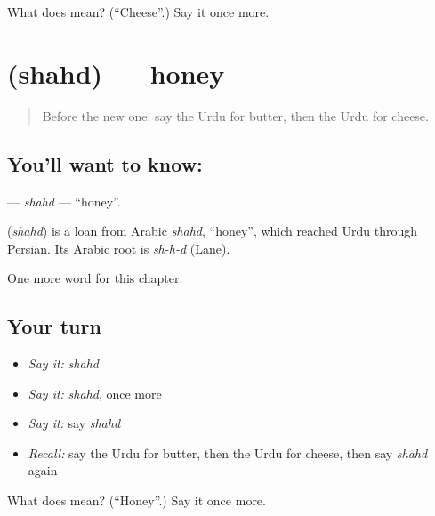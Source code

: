 \begin{tcolorbox}[breakable,colback=teal!4,colframe=teal!35!black,title={Before you move on}]
What does  mean? (\textquotedblleft{}Cheese\textquotedblright{}.) Say it once more.
\end{tcolorbox}
\section[\texorpdfstring{\ur{شہد} (shahd)}{شہد (shahd)}]{ (shahd) — honey}

\label{lesson:UR-C56-shahd}



\begin{quote}
Before the new one: say the Urdu for butter, then the Urdu for cheese.
\end{quote}

\subsection*{You'll want to know: }
\textbf{} — \emph{shahd} — \textquotedblleft{}honey\textquotedblright{}.

\begin{cousinweb}
\textbf{} (\emph{shahd}) is a loan from Arabic \emph{shahd}, \textquotedblleft{}honey\textquotedblright{}, which reached Urdu through Persian. Its Arabic root is \emph{sh-h-d} (Lane).
\end{cousinweb}

\begin{grammarlens}[title={What you've built}]
One more word for this chapter.
\end{grammarlens}

\subsection*{Your turn}
\begin{itemize}
\raggedright
  \item \emph{Say it:} \emph{shahd}
  \item \emph{Say it:} \emph{shahd}, once more
  \item \emph{Say it:} say \emph{shahd}
  \item \emph{Recall:} say the Urdu for butter, then the Urdu for cheese, then say \emph{shahd} again
\end{itemize}

\begin{tcolorbox}[breakable,colback=teal!4,colframe=teal!35!black,title={Before you move on}]
What does  mean? (\textquotedblleft{}Honey\textquotedblright{}.) Say it once more.
\end{tcolorbox}
